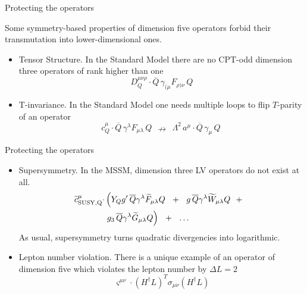 \documentclass[pdf,UofT06talk,slideColor,colorBG,accumulate]{prosper}
\newcommand{\wt}{\widetilde}
\newcommand{\ov}{\overline}
\begin{document}
\begin{slide}{Protecting the operators}

        Some symmetry-based properties of dimension five operators forbid
        their transmutation into lower-dimensional ones.
	
\begin{itemize}
\item	{\myit Tensor Structure}. In the Standard Model there are no
	CPT-odd dimension three operators of rank higher than one
\[
	D_{Q}^{\mu\nu\rho} \cdot
	\ov{Q}\, \gamma_{(\mu} F_{\rho)\nu}\, Q
\]

\item	{\myit T-invariance}. In the Standard Model one needs multiple
	loops to flip $ T $-parity of an operator
\[
	c_{Q}^\mu \cdot
	\ov{Q}\, \gamma^\lambda F_{\mu\lambda}\, Q
	~~\nrightarrow~~
	\Lambda^2 \, a^\mu \cdot \ov{Q}\, \gamma_\mu\, Q~
\]

\end{itemize}

\end{slide}


\begin{slide}{Protecting the operators}

\begin{itemize}
\item 	{\myit Supersymmetry}. 
	In the MSSM, dimension three LV operators do not exist at all.
\begin{align*}
	\wt{c}_{\rm SUSY,Q}^\mu \cdot 
	&
	\left( 
	Y_Q g'\, \ov{Q} \gamma^\lambda \wt{F}_{\mu\lambda} Q   ~~+~~
	g\,  \ov{Q} \gamma^\lambda \wt{W}_{\mu\lambda} Q   ~~+~~
	\right . 
	\\
	& 
	\left .
	g_3\, \ov{Q} \gamma^\lambda \wt{G}_{\mu\lambda} Q 
	\right)  ~~+~~
	\ldots~
\end{align*}
	As usual, supersymmetry turns quadratic divergencies into
	logarithmic.

\item	{\myit Lepton number violation}.
	There is a unique example of an operator of dimension five
	which violates the lepton number by $ \Delta L = 2 $
\[
	\varsigma^{\mu\nu} \cdot
	\left( H^\dag L \right)^T \sigma_{\mu\nu} \left( H^\dag L \right)
\]

\end{itemize}

\end{slide}
\end{document}
